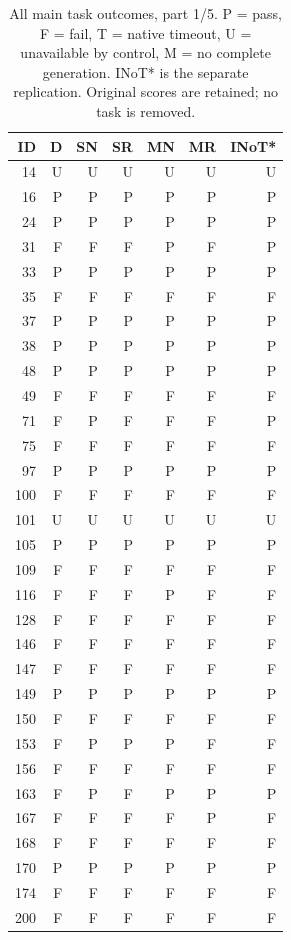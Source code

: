 \begin{table}[!htbp]\centering\footnotesize
\caption{All main task outcomes, part 1/5. P = pass, F = fail, T = native timeout, U = unavailable by control, M = no complete generation. INoT* is the separate replication. Original scores are retained; no task is removed.}
\begin{tabular*}{\textwidth}{@{\extracolsep{\fill}}rrrrrrr}\toprule
ID & D & SN & SR & MN & MR & INoT*\\\midrule
14 & U & U & U & U & U & U\\
16 & P & P & P & P & P & P\\
24 & P & P & P & P & P & P\\
31 & F & F & F & P & F & P\\
33 & P & P & P & P & P & P\\
35 & F & F & F & F & F & F\\
37 & P & P & P & P & P & P\\
38 & P & P & P & P & P & P\\
48 & P & P & P & P & P & P\\
49 & F & F & F & F & F & F\\
71 & F & P & F & F & F & P\\
75 & F & F & F & F & F & F\\
97 & P & P & P & P & P & P\\
100 & F & F & F & F & F & F\\
101 & U & U & U & U & U & U\\
105 & P & P & P & P & P & P\\
109 & F & F & F & F & F & F\\
116 & F & F & F & P & F & F\\
128 & F & F & F & F & F & F\\
146 & F & F & F & F & F & F\\
147 & F & F & F & F & F & F\\
149 & P & P & P & P & P & P\\
150 & F & F & F & F & F & F\\
153 & F & P & P & P & F & F\\
156 & F & F & F & F & F & F\\
163 & F & P & F & P & P & P\\
167 & F & F & F & F & P & F\\
168 & F & F & F & F & F & F\\
170 & P & P & P & P & P & P\\
174 & F & F & F & F & F & F\\
200 & F & F & F & F & F & F\\

\end{tabular*}
\end{table}
